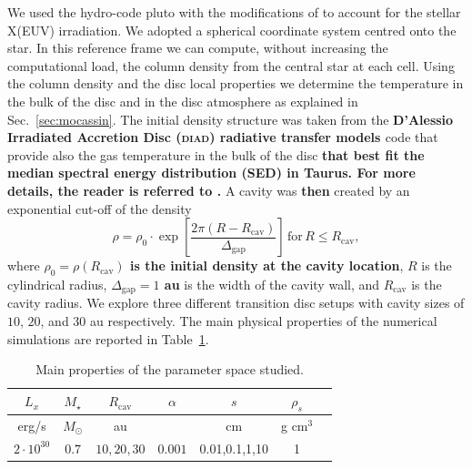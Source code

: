 \documentclass[fleqn,usenatbib]{mnras}
\begin{document}
        We used the hydro-code {\sc pluto} \citep{Mignone2007} with the modifications of \citet{Picogna2019} to account for the stellar X(EUV) irradiation. 
        We adopted a spherical coordinate system centred onto the star.
        In this reference frame we can compute, without increasing the computational load, the column density from the central star at each cell.
        Using the column density and the disc local properties we determine the temperature in the bulk of the disc and in the disc atmosphere as explained in Sec.~\ref{sec:mocassin}.
        The initial density structure was taken from the \textbf{D’Alessio Irradiated Accretion Disc (\textsc{diad}) radiative transfer models \citep{DAlessio1998,DAlessio1999,DAlessio2001,DAlessio2005,DAlessio2006}} code that provide also the gas temperature in the bulk of the disc \textbf{that best fit the median spectral energy distribution (SED) in Taurus. For more details, the reader is referred to \citet{Picogna2019}.} A cavity was \textbf{then} created by an exponential cut-off of the density
        \begin{equation}
          \rho = \rho_0 \cdot \exp{\left[\frac{2\pi(R-R_\textrm{cav})}{\Delta_\textrm{gap}}\right]}\, \textrm{for}\, R \leq R_\textrm{cav},
        \end{equation}
        where \textbf{$\rho_0 = \rho(R_\mathrm{cav})$ is the initial density at the cavity location}, $R$ is the cylindrical radius, \textbf{$\Delta_\textrm{gap} = 1$ au} is the width of the cavity wall, and $R_\textrm{cav}$ is the cavity radius.
        We explore three different transition disc setups with cavity sizes of $10$, $20$, and $30$ au respectively.
        The main physical properties of the numerical simulations are reported in Table~\ref{tab:PlutoPars}.
           
        \begin{table}
        \centering
        \begin{tabular}{c c c c c c c}
         \hline
         $L_x$ & $M_\star$ & $R_\textrm{cav}$ & $\alpha$ & $s$ & $\rho_s$\\ 
         \hline
         erg/s & $M_\odot$ & au & & cm & g cm$^3$\\
         \hline
         $2\cdot 10^{30}$ & $0.7$ & $10, 20, 30$ & $0.001$ & 0.01,0.1,1,10 & 1 \\ 
        \hline
        \end{tabular}
        \caption{\label{tab:PlutoPars} Main properties of the parameter space studied.}
        \end{table}
\end{document}
